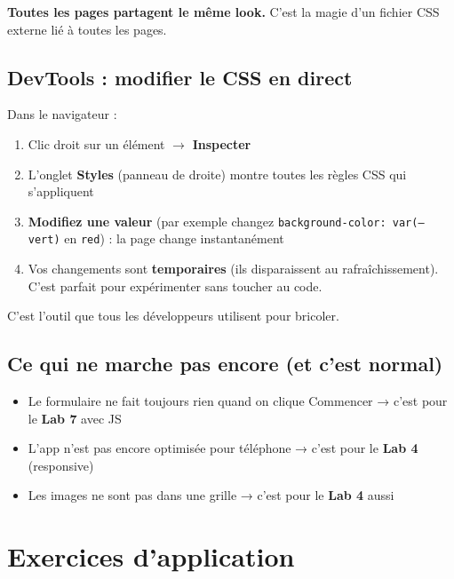 \documentclass[11pt,a4paper]{article}
\newcommand{\cmark}{\ding{51}}
\begin{document}
\textbf{Toutes les pages partagent le même look.} C'est la magie d'un
fichier CSS externe lié à toutes les pages. \cmark

\subsection{DevTools : modifier le CSS en direct}

\begin{infobox}
Dans le navigateur :
\begin{enumerate}[nosep]
    \item Clic droit sur un élément $\to$ \textbf{Inspecter}
    \item L'onglet \textbf{Styles} (panneau de droite) montre toutes les règles CSS qui s'appliquent
    \item \textbf{Modifiez une valeur} (par exemple changez \texttt{background-color: var(--vert)} en \texttt{red}) : la page change instantanément
    \item Vos changements sont \textbf{temporaires} (ils disparaissent au rafraîchissement). C'est parfait pour expérimenter sans toucher au code.
\end{enumerate}
C'est l'outil que tous les développeurs utilisent pour bricoler.
\end{infobox}

\subsection{Ce qui ne marche pas encore (et c'est normal)}

\begin{itemize}[leftmargin=*,nosep]
    \item Le formulaire ne fait toujours rien quand on clique \og{}Commencer\fg{} → c'est pour le \textbf{Lab 7} avec JS
    \item L'app n'est pas encore optimisée pour téléphone → c'est pour le \textbf{Lab 4} (responsive)
    \item Les images ne sont pas dans une grille → c'est pour le \textbf{Lab 4} aussi
\end{itemize}

\newpage

\section{Exercices d'application}
\end{document}
